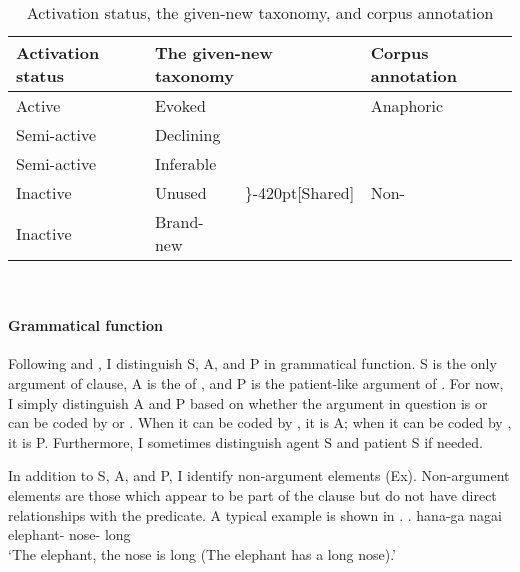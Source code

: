 \begin{table}
	\caption{Activation status, the given-new taxonomy, and corpus annotation}
	\label{ActStatusCorpus}
	\begin{center}
	\begin{tabular}{llll}
	\toprule
	Activation status & \multicolumn{2}{l}{The given-new taxonomy} & Corpus annotation \\
	\midrule
	Active & Evoked & & Anaphoric \\
	Semi-active & Declining &  & \\
	\rowcolor{gray}
	Semi-active & Inferable &  & \\
	\rowcolor{gray}
	Inactive & Unused & \rdelim\}{-4}{20pt}[Shared] & Non-\isi{anaphoric} \\
	\rowcolor{gray}
	Inactive & Brand-new & &  \\
	\bottomrule
	\end{tabular}\\
	\end{center}
\end{table}


\paragraph{Grammatical function}

Following  and ,
I distinguish S, A, and P in grammatical function.
S is the only argument of  clause,
A is the  of ,
and P is the patient-like argument of .
For now, I simply distinguish A and P based on whether the argument in question is or can be coded by  or .
When it can be coded by , it is A;
when it can be coded by , it is P.
Furthermore, I sometimes distinguish agent S and patient S if needed.

In addition to S, A, and P,
I identify non-argument elements (Ex).\label{FW:Cor:TopFoc:ExDef}
Non-argument elements are those which appear to be part of the clause but do not have direct relationships with the predicate.
A typical example is shown in \Next.
%
\exg.  hana-ga nagai \\
		elephant- nose- long \\
		`The elephant, the nose is long (The elephant has a long nose).' \hfill{\cite{mikami60}}

